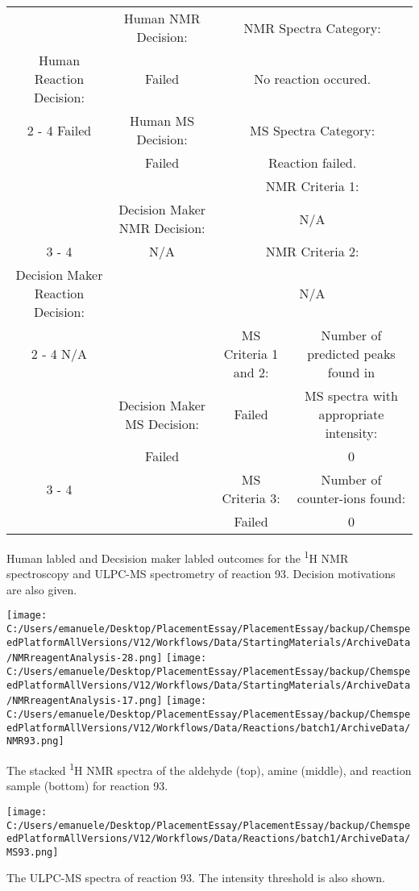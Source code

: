 \documentclass{article}%
\begin{document}
\begin{Decision Table}[H]%
\begin{tabular}{|c|c|c|c|}%
\hline%
&Human NMR Decision:&\multicolumn{2}{|c|}{NMR Spectra Category:}\\%
Human Reaction Decision:&Failed&\multicolumn{2}{|c|}{No reaction occured.}\\%
\cline{2%
-%
4}%
Failed&Human MS Decision:&\multicolumn{2}{|c|}{MS Spectra Category:}\\%
&Failed&\multicolumn{2}{|c|}{Reaction failed.}\\%
\hline%
&&\multicolumn{2}{|c|}{NMR Criteria 1:}\\%
&Decision Maker NMR Decision:&\multicolumn{2}{|c|}{N/A}\\%
\cline{3%
-%
4}%
&N/A&\multicolumn{2}{|c|}{NMR Criteria 2:}\\%
Decision Maker Reaction Decision:&&\multicolumn{2}{|c|}{N/A}\\%
\cline{2%
-%
4}%
N/A&&MS Criteria 1 and 2:&Number of predicted peaks found in\\%
&Decision Maker MS Decision:&Failed&MS spectra with appropriate intensity:\\%
&Failed&&0\\%
\cline{3%
-%
4}%
&&MS Criteria 3:&Number of counter{-}ions found:\\%
&&Failed&0\\%
\hline%
\end{tabular}%
\caption{Human labled and Decsision maker labled outcomes for the \textsuperscript{1}H NMR spectroscopy and ULPC-MS spectrometry of reaction 93. Decision motivations are also given.}%
\end{Decision Table}%
\begin{NMR Spectra}[H]%
\begin{center}%
\texttt{[image: C:/Users/emanuele/Desktop/PlacementEssay/PlacementEssay/backup/ChemspeedPlatformAllVersions/V12/Workflows/Data/StartingMaterials/ArchiveData/NMRreagentAnalysis-28.png]}\hfill%
\texttt{[image: C:/Users/emanuele/Desktop/PlacementEssay/PlacementEssay/backup/ChemspeedPlatformAllVersions/V12/Workflows/Data/StartingMaterials/ArchiveData/NMRreagentAnalysis-17.png]}\hfill%
\texttt{[image: C:/Users/emanuele/Desktop/PlacementEssay/PlacementEssay/backup/ChemspeedPlatformAllVersions/V12/Workflows/Data/Reactions/batch1/ArchiveData/NMR93.png]}\hfill%
\end{center}%
\caption{The stacked \textsuperscript{1}H NMR spectra of the aldehyde (top), amine (middle), and reaction sample (bottom) for reaction 93.}%
\end{NMR Spectra}%
\begin{MS Spectra}[H]%
\begin{center}%
\texttt{[image: C:/Users/emanuele/Desktop/PlacementEssay/PlacementEssay/backup/ChemspeedPlatformAllVersions/V12/Workflows/Data/Reactions/batch1/ArchiveData/MS93.png]}\hfill%
\end{center}%
\caption{The ULPC-MS spectra of reaction 93. The intensity threshold is also shown.}%
\end{MS Spectra}%
\end{document}
